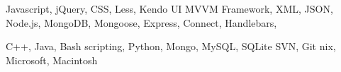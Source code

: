 
\citembullet Javascript, jQuery, CSS, Less, Kendo UI MVVM Framework, XML, JSON, 
\citembullet Node.js, MongoDB, Mongoose, Express, Connect, Handlebars, 

\citembullet C++, Java, Bash scripting,  Python, 
\citembullet Mongo, MySQL, SQLite %
\citembullet SVN, Git
\citembullet *nix, Microsoft, Macintosh

